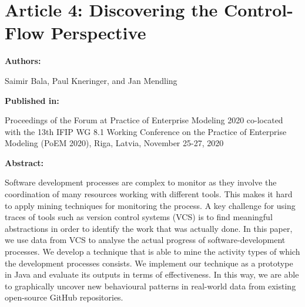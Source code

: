 \chapter{Article 4: Discovering the Control-Flow Perspective}
\label{chap:project-mining2}

{\bfseries \Large Authors: \medskip}

\noindent Saimir Bala,
Paul Kneringer, and
Jan Mendling \hfill

\bigskip

{\noindent\bfseries \Large Published in: \medskip}

\noindent Proceedings of the Forum at Practice of Enterprise Modeling 2020 co-located
with the 13th {IFIP} {WG} 8.1 Working Conference on the Practice of
Enterprise Modeling (PoEM 2020), Riga, Latvia, November 25-27, 2020

\bigskip

{\noindent\bfseries \Large Abstract: \medskip}


\noindent Software development processes are complex to monitor as they involve the coordination of many resources working with different tools.
This makes it hard to apply mining techniques for monitoring the process. 
A key challenge for using traces of tools such as version control systems (VCS) is to find meaningful abstractions in order to identify the work that was actually done. 
In this paper, we use data from VCS to analyse the actual progress of software-development processes. We develop a technique that is able to mine the activity types of which the development processes consists. 
We implement our technique as a prototype in Java and evaluate its outputs in terms of effectiveness.
In this way, we are able to graphically uncover new behavioural patterns in real-world data from existing open-source GitHub repositories.

\pagebreak


%

%





